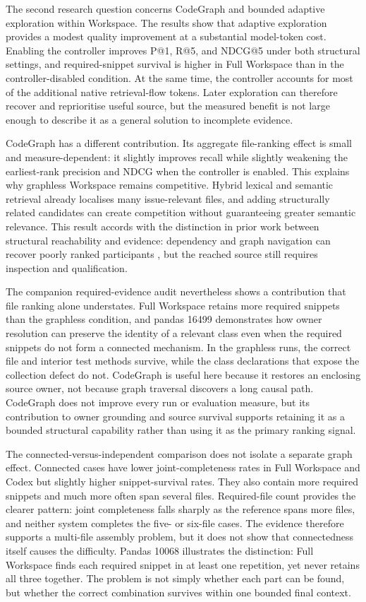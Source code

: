 The second research question concerns CodeGraph and bounded adaptive exploration within Workspace. The results show that adaptive exploration provides a modest quality improvement at a substantial model-token cost. Enabling the controller improves P@1, R@5, and NDCG@5 under both structural settings, and required-snippet survival is higher in Full Workspace than in the controller-disabled condition. At the same time, the controller accounts for most of the additional native retrieval-flow tokens. Later exploration can therefore recover and reprioritise useful source, but the measured benefit is not large enough to describe it as a general solution to incomplete evidence.

CodeGraph has a different contribution. Its aggregate file-ranking effect is small and measure-dependent: it slightly improves recall while slightly weakening the earliest-rank precision and NDCG when the controller is enabled. This explains why graphless Workspace remains competitive. Hybrid lexical and semantic retrieval already localises many issue-relevant files, and adding structurally related candidates can create competition without guaranteeing greater semantic relevance. This result accords with the distinction in prior work between structural reachability and evidence: dependency and graph navigation can recover poorly ranked participants \textcite{Petrenko2013DepIR,Chen2025LocAgent}, but the reached source still requires inspection and qualification.

The companion required-evidence audit nevertheless shows a contribution that file ranking alone understates. Full Workspace retains more required snippets than the graphless condition, and pandas 16499 demonstrates how owner resolution can preserve the identity of a relevant class even when the required snippets do not form a connected mechanism. In the graphless runs, the correct file and interior test methods survive, while the class declarations that expose the collection defect do not. CodeGraph is useful here because it restores an enclosing source owner, not because graph traversal discovers a long causal path. CodeGraph does not improve every run or evaluation measure, but its contribution to owner grounding and source survival supports retaining it as a bounded structural capability rather than using it as the primary ranking signal.

The connected-versus-independent comparison does not isolate a separate graph effect. Connected cases have lower joint-completeness rates in Full Workspace and Codex but slightly higher snippet-survival rates. They also contain more required snippets and much more often span several files. Required-file count provides the clearer pattern: joint completeness falls sharply as the reference spans more files, and neither system completes the five- or six-file cases. The evidence therefore supports a multi-file assembly problem, but it does not show that connectedness itself causes the difficulty. Pandas 10068 illustrates the distinction: Full Workspace finds each required snippet in at least one repetition, yet never retains all three together. The problem is not simply whether each part can be found, but whether the correct combination survives within one bounded final context.


